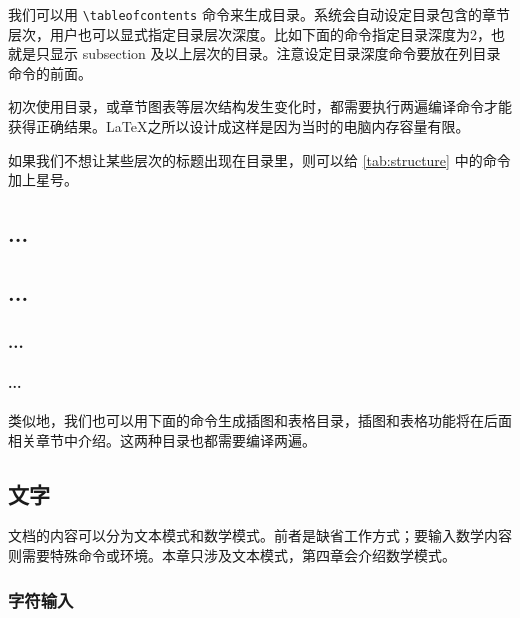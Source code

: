 我们可以用 \verb|\tableofcontents| 命令来生成目录。系统会自动设定目录包含的章节层次，用户也可以显式指定目录层次深度。比如下面的命令指定目录深度为2，也就是只显示 subsection 及以上层次的目录。注意设定目录深度命令要放在列目录命令的前面。

\begin{Code}[]
\setcounter{tocdepth}{2} %
\tableofcontents         %
\end{Code}

初次使用目录，或章节图表等层次结构发生变化时，都需要执行两遍编译命令才能获得正确结果。\LaTeX 之所以设计成这样是因为当时的电脑内存容量有限。

如果我们不想让某些层次的标题出现在目录里，则可以给 \autoref{tab:structure} 中的命令加上星号。

\begin{Code}[]
\chapter*{...}
\section*{...}
\subsection*{...}
\subsubsection*{...}
\end{Code}

类似地，我们也可以用下面的命令生成插图和表格目录，插图和表格功能将在后面相关章节中介绍。这两种目录也都需要编译两遍。

\begin{Code}[]
\listoffigures
\listoftables
\end{Code}

\section{文字}

文档的内容可以分为文本模式和数学模式。前者是缺省工作方式；要输入数学内容则需要特殊命令或环境。本章只涉及文本模式，第四章会介绍数学模式。

\subsection{字符输入}
\label{sec:char_input}


